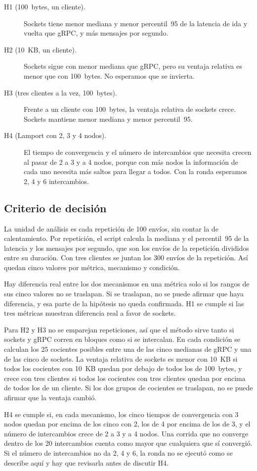 \begin{description}
  \item[H1 (100~bytes, un cliente).] Sockets tiene menor mediana y menor percentil~95 de la latencia de ida y vuelta que gRPC, y más mensajes por segundo.
  \item[H2 (10~KB, un cliente).] Sockets sigue con menor mediana que gRPC, pero su ventaja relativa es menor que con 100~bytes. No esperamos que se invierta.
  \item[H3 (tres clientes a la vez, 100~bytes).] Frente a un cliente con 100~bytes, la ventaja relativa de sockets crece. Sockets mantiene menor mediana y menor percentil~95.
  \item[H4 (Lamport con 2, 3 y 4 nodos).] El tiempo de convergencia y el número de intercambios que necesita crecen al pasar de 2 a 3 y a 4 nodos, porque con más nodos la información de cada uno necesita más saltos para llegar a todos. Con la ronda esperamos 2, 4 y 6 intercambios.
\end{description}

\subsection{Criterio de decisión}

La unidad de análisis es cada repetición de 100 envíos, sin contar la de calentamiento. Por repetición, el script calcula la mediana y el percentil~95 de la latencia y los mensajes por segundo, que son los envíos de la repetición divididos entre su duración. Con tres clientes se juntan los 300 envíos de la repetición. Así quedan cinco valores por métrica, mecanismo y condición.

Hay diferencia real entre los dos mecanismos en una métrica solo si los rangos de sus cinco valores no se traslapan. Si se traslapan, no se puede afirmar que haya diferencia, y esa parte de la hipótesis no queda confirmada. H1 se cumple si las tres métricas muestran diferencia real a favor de sockets.

Para H2 y H3 no se emparejan repeticiones, así que el método sirve tanto si sockets y gRPC corren en bloques como si se intercalan. En cada condición se calculan los 25 cocientes posibles entre una de las cinco medianas de gRPC y una de las cinco de sockets. La ventaja relativa de sockets es menor con 10~KB si todos los cocientes con 10~KB quedan por debajo de todos los de 100~bytes, y crece con tres clientes si todos los cocientes con tres clientes quedan por encima de todos los de un cliente. Si los dos grupos de cocientes se traslapan, no se puede afirmar que la ventaja cambió.

H4 se cumple si, en cada mecanismo, los cinco tiempos de convergencia con 3 nodos quedan por encima de los cinco con 2, los de 4 por encima de los de 3, y el número de intercambios crece de 2 a 3 y a 4 nodos. Una corrida que no converge dentro de los 20 intercambios cuenta como mayor que cualquiera que sí convergió. Si el número de intercambios no da 2, 4 y 6, la ronda no se ejecutó como se describe aquí y hay que revisarla antes de discutir H4.
